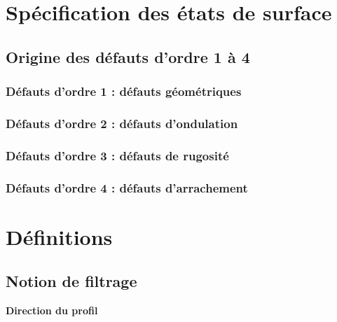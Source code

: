 \documentclass[10pt]{article}
\begin{document}



\setlength{\parskip}{0ex plus 0.2ex minus 0ex}
 \renewcommand{\contentsname}{}
 \renewcommand{\baselinestretch}{1}

\tableofcontents

 \renewcommand{\baselinestretch}{1.2}
\setlength{\parskip}{2ex plus 0.5ex minus 0.2ex}



\section{Spécification des états de surface}
\subsection{Origine des défauts d'ordre 1 à 4}
\subsubsection{Défauts d'ordre 1 : défauts géométriques}

\subsubsection{Défauts d'ordre 2 : défauts d'ondulation}

\subsubsection{Défauts d'ordre 3 : défauts de rugosité}

\subsubsection{Défauts d'ordre 4 : défauts d'arrachement}

\section{Définitions}
\subsection{Notion de filtrage}

\begin{minipage}[c]{.2\linewidth}
\begin{center}
\end{center}
\end{minipage}\hfill
\begin{minipage}[c]{.75\linewidth}
\begin{defi}
\textbf{Direction du profil} 

\end{defi}
\end{minipage}
\end{document}
